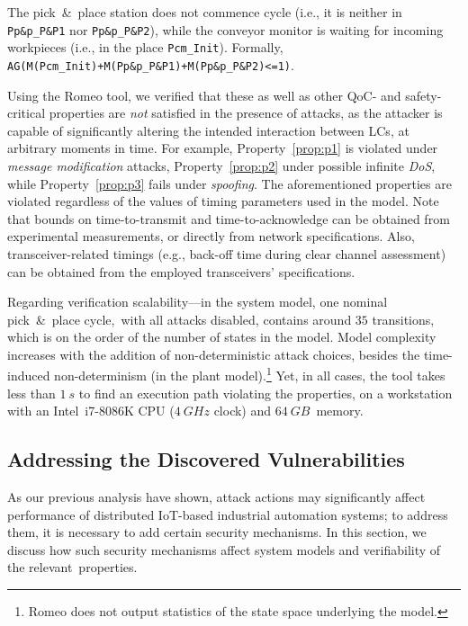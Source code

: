 \begin{property}\label{prop:p3}
  The pick~\&~place station does not commence cycle (i.e., it is neither in \verb!Pp&p_P&P1! nor \verb!Pp&p_P&P2!), while the conveyor monitor is waiting for incoming workpieces (i.e., in the place \verb!Pcm_Init!). Formally, \verb!AG(M(Pcm_Init)+M(Pp&p_P&P1)+M(Pp&p_P&P2)<=1)!.%
\end{property}

Using the Romeo tool, we verified that these as well as other QoC- and safety-critical properties are \emph{not} satisfied in the presence of attacks, as the attacker is capable of significantly altering the intended interaction between LCs, at arbitrary moments in time. For example, Property~\ref{prop:p1} is violated under \emph{message modification} attacks, Property~\ref{prop:p2} under possible infinite \emph{DoS}, while Property~\ref{prop:p3} fails under \emph{spoofing}.
The aforementioned properties are violated regardless of the values of timing parameters used in the model. Note that bounds on time-to-transmit and time-to-acknowledge can be obtained from experimental measurements, or directly from network specifications. Also, transceiver-related timings (e.g., back-off time during clear channel assessment) can be obtained from the employed transceivers' specifications. %




Regarding verification scalability---in the system model, one nominal pick~\&~place cycle,~with all attacks disabled, contains around $35$ transitions, which is on the order of the number of states in the model. Model complexity increases with the addition of non-deterministic attack choices, besides the time-induced non-determinism (in the plant model).\footnote{Romeo does not output statistics of the state space underlying the model.} Yet, in all cases, the tool takes less than $1~s$ to find an execution path violating the properties, on a workstation with an Intel~i7-8086K CPU ($4~GHz$ clock) and $64~GB$~memory.

\subsection{Addressing the Discovered Vulnerabilities}
As our previous analysis have shown, attack actions may significantly affect performance of distributed IoT-based industrial automation systems; to address them, it is necessary to add certain security mechanisms. In this section, we discuss how such security mechanisms affect  system models and verifiability of the relevant~properties.


